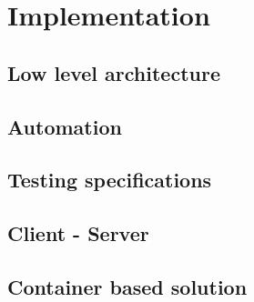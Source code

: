 \chapter{Implementation}

\section{Low level architecture}

\section{Automation}

\section{Testing specifications}

\section{Client - Server}

\section{Container based solution}
